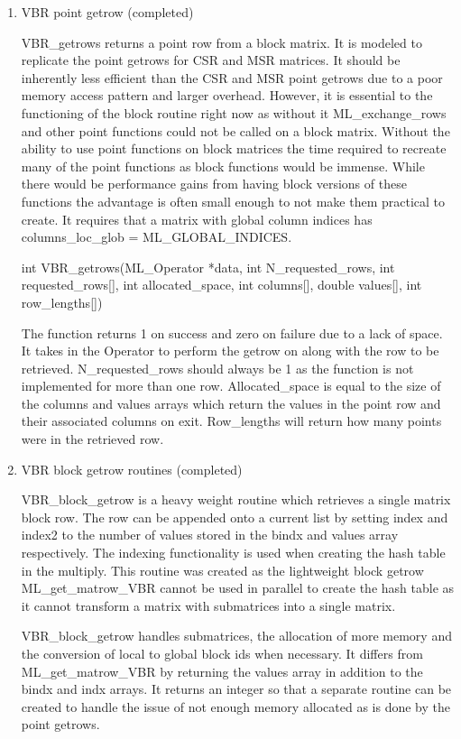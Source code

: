 \documentclass[10pt,letter,relax]{SANDreport}
\begin{document}
\begin{enumerate}
\begin{enumerate}
    \end{enumerate}
  \item  VBR point getrow (completed)

  VBR\_getrows returns a point row from a block matrix.  It is modeled to replicate the point getrows for CSR and MSR matrices.
It should be inherently less efficient than the CSR and MSR point getrows due to a poor memory access pattern and larger overhead.
However, it is essential to the functioning of the block routine right now as without it ML\_exchange\_rows and other point functions could not be called on a block matrix.
Without the ability to use point functions on block matrices the time required to recreate many of the point functions as block functions would be immense.
While there would be performance gains from having block versions of these functions the advantage is often small enough to not make them practical to create.
It requires that a matrix with global column indices has columns\_loc\_glob = ML\_GLOBAL\_INDICES.

int VBR\_getrows(ML\_Operator *data, int N\_requested\_rows, int requested\_rows[],
   int allocated\_space, int columns[], double values[], int row\_lengths[])

The function returns 1 on success and zero on failure due to a lack of space.  It takes in the Operator to perform the getrow on along with the row to be retrieved.
N\_requested\_rows should always be 1 as the function is not implemented for more than one row.
Allocated\_space is equal to the size of the columns and values arrays which return the values in the point row and their associated columns on exit.
Row\_lengths will return how many points were in the retrieved row.  

  \item  VBR block getrow routines (completed)

  VBR\_block\_getrow is a heavy weight routine which retrieves a single matrix block row.  The row can be appended onto a current list by setting index and index2 to the number of values stored in the bindx and values array respectively.
The indexing functionality is used when creating the hash table in the multiply.  This routine was created as the lightweight block getrow ML\_get\_matrow\_VBR cannot be used in parallel to create the hash table as it cannot transform a matrix with submatrices into a single matrix.

  VBR\_block\_getrow handles submatrices, the allocation of more memory and the conversion of local to global block ids when necessary.  It differs from ML\_get\_matrow\_VBR by returning the values array in addition to the bindx and indx arrays.
It returns an integer so that a separate routine can be created to handle the issue of not enough memory allocated as is done by the point getrows.


\end{enumerate}
\end{document}
